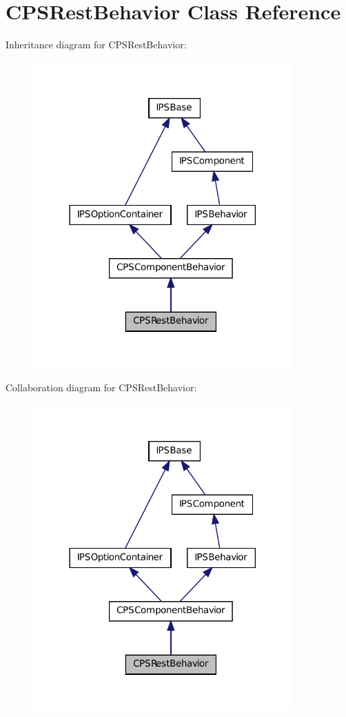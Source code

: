 \hypertarget{classCPSRestBehavior}{
\section{CPSRestBehavior Class Reference}
\label{classCPSRestBehavior}
}


Inheritance diagram for CPSRestBehavior:\nopagebreak
\begin{figure}[H]
\begin{center}
\leavevmode
\includegraphics[width=282pt]{classCPSRestBehavior__inherit__graph}
\end{center}
\end{figure}


Collaboration diagram for CPSRestBehavior:\nopagebreak
\begin{figure}[H]
\begin{center}
\leavevmode
\includegraphics[width=282pt]{classCPSRestBehavior__coll__graph}
\end{center}
\end{figure}
